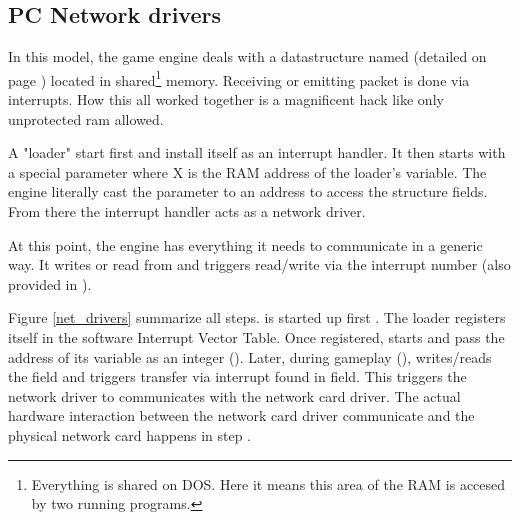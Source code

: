 




\subsection{PC Network drivers}
In this model, the game engine deals with a datastructure named  (detailed on page \pageref{doomcom_t.c}) located in shared\footnote{Everything is shared on DOS. Here it means this area of the RAM is accesed by two running programs.} memory. Receiving or emitting packet is done via interrupts. How this all worked together is a magnificent hack like only unprotected ram allowed.\\
\par
A "loader" start first and install itself as an interrupt handler. It then starts  with a special parameter  where X is the RAM address of the loader's  variable. The engine literally cast the parameter to an address  to access the structure fields. From there the interrupt handler acts as a network driver.\\
\par

\par
 At this point, the engine has everything it needs to communicate in a generic way. It writes or read from  and triggers read/write via the interrupt number (also provided in ).\\
\par
{}
\par
\vspace{-10pt}
 Figure \ref{net_drivers} summarize all steps.  is started up first . The loader registers itself in the software Interrupt Vector Table. Once registered,  starts  and pass the address of its  variable as an integer (). Later, during gameplay (),  writes/reads the   field and triggers transfer via interrupt found in  field. This triggers  the \doom{} network driver to communicates with the network card driver. The actual hardware interaction between the network card driver communicate and the physical network card happens in step .




